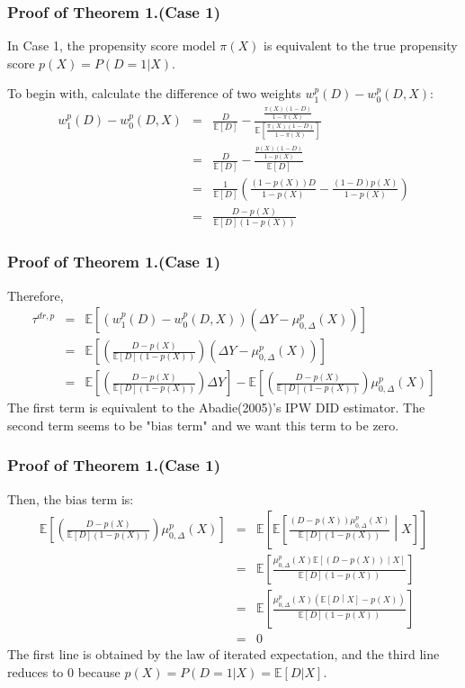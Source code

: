 \documentclass[fleqn]{beamer}
\begin{document}
\begin{frame}\frametitle{Proof of Theorem 1.(Case 1)}
    In Case 1, the propensity score model $\pi(X)$ is equivalent to the true propensity score $p(X) = P(D = 1|X)$. 

    To begin with, calculate the difference of two weights $w^{p}_{1}(D) - w^{p}_{0}(D,X)$:
    \begin{eqnarray*}
        w^{p}_{1}(D) - w^{p}_{0}(D,X) &=& \frac{D}{ \mathbb{E}[D]} - \frac{ \frac{\pi(X)(1-D)}{1-\pi(X)}}{ \mathbb{E}[\frac{\pi(X)(1-D)}{1-\pi(X)}]} \\
        &=& \frac{D}{\mathbb{E}[D]} - \frac{\frac{p(X)(1-D)}{1-p(X)}}{\mathbb{E}[D]} \\
        &=& \frac{1}{\mathbb{E}[D]} \left(\frac{(1-p(X))D}{1-p(X)} - \frac{(1-D)p(X)}{1-p(X)} \right) \\
        &=& \frac{D - p(X)}{\mathbb{E}[D](1-p(X))}
    \end{eqnarray*}
\end{frame}

\begin{frame}\frametitle{Proof of Theorem 1.(Case 1)}
Therefore,
    \begin{eqnarray*}
        \tau ^{dr,p} &=& \mathbb{E}\left[(w^{p}_{1}(D) - w^{p}_{0}(D,X))(\Delta Y - \mu^{p}_{0,\Delta}(X))\right] \\
        &=& \mathbb{E}\left[\left(\frac{D - p(X)}{\mathbb{E}[D](1-p(X))}\right)\left(\Delta Y - \mu^{p}_{0,\Delta}(X)\right)\right] \\
        &=& \mathbb{E}\left[\left(\frac{D - p(X)}{\mathbb{E}[D](1-p(X))}\right)\Delta Y\right] - \mathbb{E}\left[\left(\frac{D - p(X)}{\mathbb{E}[D](1-p(X))}\right)\mu^{p}_{0,\Delta}(X)\right]
    \end{eqnarray*}
The first term is equivalent to the Abadie(2005)'s IPW DID estimator. The second term seems to be "bias term" and we want this term to be zero.
\end{frame}

\begin{frame}\frametitle{Proof of Theorem 1.(Case 1)}
    Then, the bias term is:
    \begin{eqnarray*}
        \mathbb{E}\left[\left(\frac{D-p(X)}{\mathbb{E}[D](1-p(X))}\right)\mu^{p}_{0, \Delta}(X)\right] &=& \mathbb{E}\left[\mathbb{E}\left[\frac{\left(D-p(X)\right)\mu^{p}_{0,\Delta}(X)}{\mathbb{E}[D](1-p(X))}\middle| X\right]\right] \\
        &=& \mathbb{E}\left[\frac{\mu^{p}_{0,\Delta}(X)\mathbb{E}\left[(D-p(X))\middle|X\right]}{\mathbb{E}[D](1-p(X))}\right]\\
        &=& \mathbb{E}\left[\frac{\mu^{p}_{0,\Delta}(X) \left(\mathbb{E}\left[D\middle|X\right] - p(X)\right)}{\mathbb{E}\left[D\right](1-p(X))}\right] \\
        &=& 0
    \end{eqnarray*}
The first line is obtained by the law of iterated expectation, and the third line reduces to 0 because $p(X) = P(D = 1|X) = \mathbb{E}[D|X]$.
\end{frame}
\end{document}

